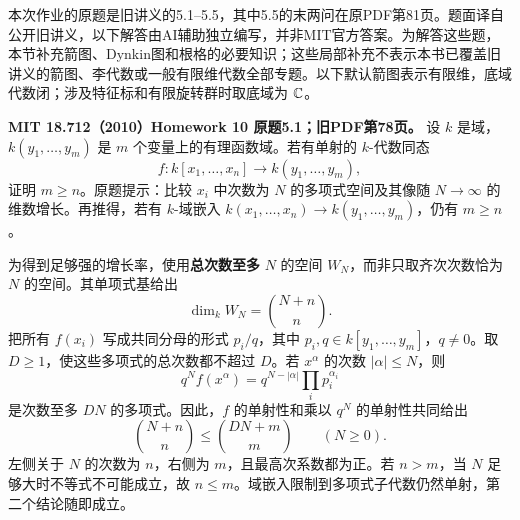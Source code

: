 本次作业的原题是旧讲义的5.1--5.5，其中5.5的末两问在原PDF第81页。题面译自公开旧讲义，以下解答由AI辅助独立编写，并非MIT官方答案。为解答这些题，本节补充箭图、Dynkin图和根格的必要知识；这些局部补充不表示本书已覆盖旧讲义的箭图、李代数或一般有限维代数全部专题。以下默认箭图表示有限维，底域代数闭；涉及特征标和有限旋转群时取底域为 $\mathbb C$。

\begin{exercise}\label{hw:5.1}
\textbf{MIT 18.712（2010）Homework 10 原题5.1；旧PDF第78页。}
设 $k$ 是域，$k(y_1,\ldots,y_m)$ 是 $m$ 个变量上的有理函数域。若有单射的 $k$-代数同态
\[
 f:k[x_1,\ldots,x_n]\longrightarrow k(y_1,\ldots,y_m),
\]
证明 $m\ge n$。原题提示：比较 $x_i$ 中次数为 $N$ 的多项式空间及其像随 $N\to\infty$ 的维数增长。再推得，若有 $k$-域嵌入 $k(x_1,\ldots,x_n)\to k(y_1,\ldots,y_m)$，仍有 $m\ge n$。
\end{exercise}
\begin{solution}
为得到足够强的增长率，使用\textbf{总次数至多} $N$ 的空间 $W_N$，而非只取齐次次数恰为 $N$ 的空间。其单项式基给出
\[
 \dim_k W_N=\binom{N+n}{n}.
\]
把所有 $f(x_i)$ 写成共同分母的形式 $p_i/q$，其中 $p_i,q\in k[y_1,\ldots,y_m]$，$q\ne0$。取 $D\ge1$，使这些多项式的总次数都不超过 $D$。若 $x^\alpha$ 的次数 $|\alpha|\le N$，则
\[
 q^N f(x^\alpha)=q^{N-|\alpha|}\prod_i p_i^{\alpha_i}
\]
是次数至多 $DN$ 的多项式。因此，$f$ 的单射性和乘以 $q^N$ 的单射性共同给出
\[
 \binom{N+n}{n}\le\binom{DN+m}{m}\qquad(N\ge0).
\]
左侧关于 $N$ 的次数为 $n$，右侧为 $m$，且最高次系数都为正。若 $n>m$，当 $N$ 足够大时不等式不可能成立，故 $n\le m$。域嵌入限制到多项式子代数仍然单射，第二个结论随即成立。
\end{solution}

